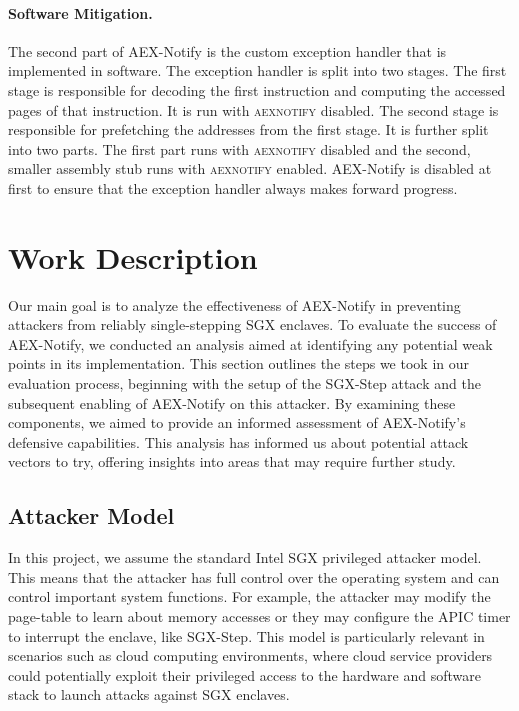 \documentclass{llncs}
\begin{document}
\paragraph{Software Mitigation.}
The second part of AEX-Notify is the custom exception handler that is implemented in software.
The exception handler is split into two stages.
The first stage is responsible for decoding the first instruction and
computing the accessed pages of that instruction.
It is run with \textsc{aexnotify} disabled.
The second stage is responsible for prefetching the addresses from the first stage.
It is further split into two parts.
The first part runs with \textsc{aexnotify} disabled
and the second, smaller assembly stub runs with \textsc{aexnotify} enabled.
AEX-Notify is disabled at first to ensure that the exception handler always makes forward progress.

\section{Work Description}

Our main goal is to analyze the effectiveness of AEX-Notify
in preventing attackers from reliably single-stepping SGX enclaves.
To evaluate the success of AEX-Notify,
we conducted an analysis aimed at identifying any potential weak points in its implementation.
This section outlines the steps we took in our evaluation process,
beginning with the setup of the SGX-Step attack and
the subsequent enabling of AEX-Notify on this attacker.
By examining these components,
we aimed to provide an informed assessment of AEX-Notify’s defensive capabilities.
This analysis has informed us about potential attack vectors to try,
offering insights into areas that may require further study.

\subsection{Attacker Model}

In this project, we assume the standard Intel SGX privileged attacker model.
This means that the attacker has full control over the operating system
and can control important system functions.
For example, the attacker may modify the page-table to learn about memory accesses
or they may configure the APIC timer to interrupt the enclave, like SGX-Step.
This model is particularly relevant in scenarios such as cloud computing
environments, where cloud service providers could potentially exploit their
privileged access to the hardware and software stack to launch attacks against SGX enclaves.
\end{document}

